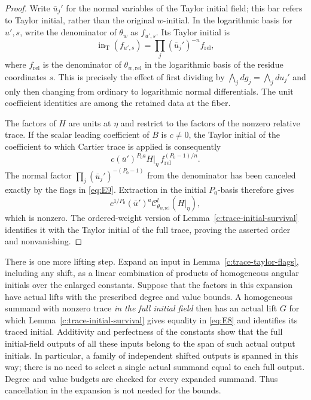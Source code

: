 \begin{proof}
Write $\bar u_j'$ for the normal variables of the Taylor initial field;
this bar refers to Taylor initial, rather than the original $w$-initial.
In the logarithmic basis for $u',s$, write the denominator of $\theta_w$
as $f_{u',s}$.  Its Taylor initial is
\[
 \operatorname{in}_{\mathrm T}(f_{u',s})
       =\prod_j(\bar u_j')^{-n}f_{\mathrm{rel}},
\]
where $f_{\mathrm{rel}}$ is the denominator of
$\theta_{w,\mathrm{rel}}$ in the logarithmic basis of the residue
coordinates $s$.  This is precisely the effect of first dividing by
$\bigwedge_jdg_j=\bigwedge_jdu_j'$ and only then changing from ordinary
to logarithmic normal differentials.  The unit coefficient identities
are among the retained data at the fiber.

The factors of $H$ are units at $\eta$ and restrict to the factors of
the nonzero relative trace.  If the scalar leading coefficient of $B$
is $c\ne0$, the Taylor initial of the coefficient to which Cartier trace
is applied is consequently
\[
 c(\bar u')^{P_0a}
       H|_\eta\, f_{\mathrm{rel}}^{(P_0-1)/n}.
\]
The normal factor $\prod_j(\bar u_j')^{-(P_0-1)}$ from the denominator
has been canceled exactly by the flags in \eqref{eq:E9}.  Extraction in
the initial $P_0$-basis therefore gives
\[
 c^{1/P_0}(\bar u')^a
       \mathcal C^l_{\theta_{w,\mathrm{rel}}}(H|_\eta),
\]
which is nonzero.  The ordered-weight version of
Lemma~\ref{c:trace-initial-survival} identifies it with the Taylor initial
of the full trace, proving the asserted order and nonvanishing.
\end{proof}

There is one more lifting step.  Expand an input in
Lemma~\ref{c:trace-taylor-flags}, including any shift, as a linear
combination of products of homogeneous angular initials over the enlarged
constants.  Suppose that the factors in this expansion have actual lifts
with the prescribed degree and value bounds.  A homogeneous summand with
nonzero trace \emph{in the full initial field} then has an actual lift
$G$ for which Lemma~\ref{c:trace-initial-survival} gives equality in
\eqref{eq:E8} and identifies its traced initial.  Additivity and perfectness
of the constants show that the full initial-field outputs of all these
inputs belong to the span of such actual output initials.  In particular,
a family of independent shifted outputs is spanned in this way; there
is no need to select a single actual summand equal to each full output.
Degree and value budgets are checked for every expanded summand.  Thus
cancellation in the expansion is not needed for the bounds.


